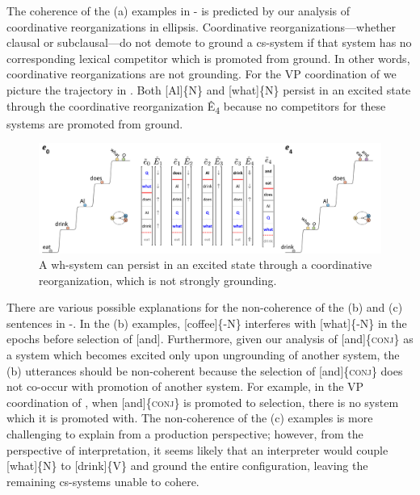 \label{ex:7:22}
    \label{ex:7:22a}
    \label{ex:7:22b}
    \label{ex:7:22c}
\z
\z

\label{ex:7:23}
    \label{ex:7:23a}
    \label{ex:7:23b}
    \label{ex:7:23c}
\z
\z

\label{ex:7:24}
    \label{ex:7:24a}
    \label{ex:7:24b}
    \label{ex:7:24c}
\z
\z

The coherence of the (a) examples in - is predicted by our analysis of coordinative reorganizations in ellipsis. Coordinative reorganizations—whether clausal or subclausal—do not demote to ground a cs-system if that system has no corresponding lexical competitor which is promoted from ground. In other words, coordinative reorganizations are not grounding. For the VP coordination of  we picture the trajectory in {}. Both [Al]\{N\} and [what]\{N\} persist in an excited state through the coordinative reorganization Ê\textsubscript{4} because no competitors for these systems are promoted from ground.

  
\begin{figure}
\includegraphics[width=\textwidth]{figures/Tilsen-img165.png}
\caption{A wh-system can persist in an excited state through a coordinative reorganization, which is not strongly grounding.}
\label{fig:7:21}
\end{figure}
 

  There are various possible explanations for the non-coherence of the (b) and (c) sentences in -. In the (b) examples, [coffee]\{-N\} interferes with [what]\{-N\} in the epochs before selection of [and]. Furthermore, given our analysis of [and]\{\textsc{conj}\} as a system which becomes excited only upon ungrounding of another system, the (b) utterances should be non-coherent because the selection of [and]\{\textsc{conj}\} does not co-occur with promotion of another system. For example, in the VP coordination of , when [and]\{\textsc{conj}\} is promoted to selection, there is no system which it is promoted with. The non-coherence of the (c) examples is more challenging to explain from a production perspective; however, from the perspective of interpretation, it seems likely that an interpreter would couple [what]\{N\} to [drink]\{V\} and ground the entire configuration, leaving the remaining cs-systems unable to cohere.

